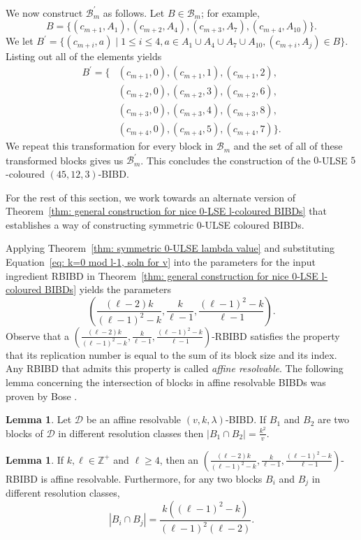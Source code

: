 \documentclass[12pt]{article}
\theoremstyle{definition}
\newtheorem{lemma}[theorem]{Lemma}
\begin{document}
We now construct $\mathcal{B}^\prime_m$ as follows. Let $B \in \mathcal{B}_m$; for example, \[B = \{(c_{m+1},A_1), (c_{m+2},A_{4}), (c_{m+3},A_{7}), (c_{m+4},A_{10})\}.\] We let $B^\prime = \{(c_{m+i}, a) \mid 1\leq i \leq 4, a\in A_1 \cup A_4 \cup A_7 \cup A_{10}, (c_{m+i}, A_j) \in B\}$. Listing out all of the elements yields
\begin{align*}
    B^\prime = \{&(c_{m+1},0), (c_{m+1},1), (c_{m+1},2), \\ 
    &(c_{m+2},0),(c_{m+2},3), (c_{m+2},6), \\
    &(c_{m+3},0), (c_{m+3},4), (c_{m+3},8), \\
    &(c_{m+4},0), (c_{m+4},5), (c_{m+4},7)\}.
\end{align*}
We repeat this transformation for every block in $\mathcal{B}_m$ and the set of all of these transformed blocks gives us $\mathcal{B}^\prime_m$. This concludes the construction of the $0$-ULSE $5$-coloured $(45,12,3)$-BIBD.

For the rest of this section, we work towards an alternate version of Theorem~\ref{thm: general construction for nice 0-LSE l-coloured BIBDs} that establishes a way of constructing symmetric $0$-ULSE coloured BIBDs.

Applying Theorem~\ref{thm: symmetric 0-ULSE lambda value} and substituting Equation~\eqref{eq: k=0 mod l-1, soln for v} into the parameters for the input ingredient RBIBD in Theorem~\ref{thm: general construction for nice 0-LSE l-coloured BIBDs} yields the parameters \[\left(\frac{(\ell-2)k}{(\ell-1)^2 - k}, \frac{k}{\ell-1}, \frac{(\ell-1)^2 - k}{\ell-1}\right).\] Observe that a $\left(\frac{(\ell-2)k}{(\ell-1)^2 - k}, \frac{k}{\ell-1}, \frac{(\ell-1)^2 - k}{\ell-1}\right)$-RBIBD satisfies the property that its replication number is equal to the sum of its block size and its index. Any RBIBD that admits this property is called \emph{affine resolvable}. The following lemma concerning the intersection of blocks in affine resolvable BIBDs was proven by Bose \cite{B42}.

\begin{lemma}\label{lem: affine resolvable intersection of blocks}
    Let $\mathcal{D}$ be an affine resolvable $(v,k,\lambda)$-BIBD. If $B_1$ and $B_2$ are two blocks of $\mathcal{D}$ in different resolution classes then $|B_1 \cap B_2| = \frac{k^2}{v}$.
\end{lemma}

\begin{lemma}\label{lem: ingredient RBIBD is an affine resolvable BIBD}
    If $k,\ell\in \mathbb{Z}^+$ and $\ell\geq 4$, then an $\left(\frac{(\ell-2)k}{(\ell-1)^2 - k}, \frac{k}{\ell-1}, \frac{(\ell-1)^2 - k}{\ell-1}\right)$-RBIBD is affine resolvable. Furthermore, for any two blocks $B_i$ and $B_j$ in different resolution classes, \[|B_i \cap B_j| = \frac{k((\ell-1)^2 - k)}{(\ell-1)^2(\ell-2)}.\]
\end{lemma}
\end{document}
